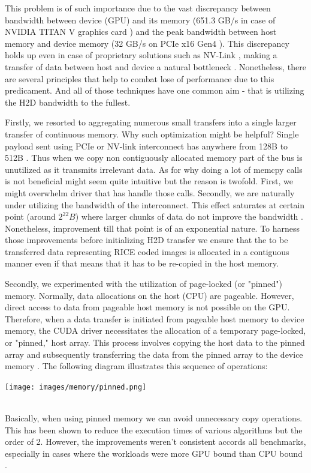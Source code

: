 \documentclass[licencjacka,en]{pracamgr}
\begin{document}
This problem is of such importance due to the vast discrepancy between bandwidth between device (GPU) and its memory (651.3 GB/s in case of NVIDIA TITAN V graphics card \cite{titan-v})  and the peak bandwidth between host memory and device memory (32 GB/s on PCIe x16 Gen4 \cite{pcie}). This discrepancy holds up even in case of proprietary solutions such as NV-Link \cite{gpu-interconnect}, making a transfer of data between host and device a natural bottleneck \cite{gpu-bottelnecks}.
Nonetheless, there are several principles that help to combat lose of performance due to this 
predicament. And all of those techniques have one common aim - that is utilizing the H2D bandwidth to the fullest. 

Firstly, we resorted to aggregating numerous small transfers into a single larger transfer
of continuous memory. Why such optimization might be helpful? 
Single payload sent using PCIe or NV-link interconnect has anywhere from 128B to 512B \cite{pcie}.
Thus when we copy non contiguously allocated memory part of the bus is unutilized as it transmits irrelevant data. 
As for why doing a lot of memcpy calls is not beneficial might seem quite intuitive but
the reason is twofold. First, we might overwhelm driver that has handle those
calls. Secondly, we are naturally under utilizing the bandwidth of the interconnect. This effect saturates
at certain point (around $2^{22} B$) where larger chunks of data do not improve the bandwidth \cite{gpu-interconnect}. Nonetheless,
improvement till that point is of an exponential nature.
To harness those improvements before initializing H2D transfer we ensure that the to be transferred data representing RICE coded images is allocated in a contiguous manner even if that means that it has to be re-copied in the host memory.  


Secondly, we experimented with the utilization of page-locked (or "pinned") memory. Normally,
data allocations on the host (CPU) are pageable. However, direct access to data from pageable host memory is not possible on the GPU. Therefore, when a data transfer is initiated from pageable host memory to device memory, the CUDA driver necessitates the allocation of a temporary page-locked, or "pinned," host array. This process involves copying the host data to the pinned array and subsequently transferring the data from the pinned array to the device memory \cite{pinned_memory}. The following diagram illustrates this sequence of operations:
\centerline{\texttt{[image: images/memory/pinned.png]}}\\
Basically, when using pinned memory we can avoid unnecessary copy operations. This has been shown to reduce the execution times 
of various algorithms but the order of 2. However, the improvements weren't consistent accords all benchmarks, especially in 
cases where the workloads were more GPU bound than CPU bound \cite{pinned_comparison}.  
\end{document}
